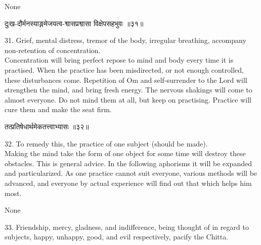 None\\

\begin{center}
\begin{sanskrit}
दुःख-दौर्मनस्याङ्गमेजयत्व-श्वासप्रश्वासा
विक्षेपसहभुवः ॥३१॥
\end{sanskrit}
\end{center}
31. Grief, mental distress, tremor of the body, irregular
breathing, accompany non-retention of concentration. \\

Concentration will bring perfect repose to mind and body every
time it is practised. When the practice has been misdirected, or not
enough controlled, these disturbances come. Repetition of Om and
self-surrender to the Lord will strengthen the mind, and bring fresh
energy. The nervous shakings will come to almost everyone. Do
not mind them at all, but keep on practising. Practice will cure them
and make the seat firm. \\

\begin{center}
\begin{sanskrit}
तत्प्रतिषेधार्थमेकतत्त्वाभ्यासः ॥३२॥
\end{sanskrit}
\end{center}
32. To remedy this, the practice of one subject (should be
made). \\

Making the mind take the form of one object for some time will
destroy these obstacles. This is general advice. In the following
aphorisms it will be expanded and particularized. As one practice
cannot suit everyone, various methods will be advanced, and everyone by
actual experience will find out that which helps him most. \\

\begin{center}
\begin{sanskrit}
None
\end{sanskrit}
\end{center}
33. Friendship, mercy, gladness, and indifference, being
thought of in regard to subjects, happy, unhappy, good, and evil
respectively, pacify the Chitta. \\

